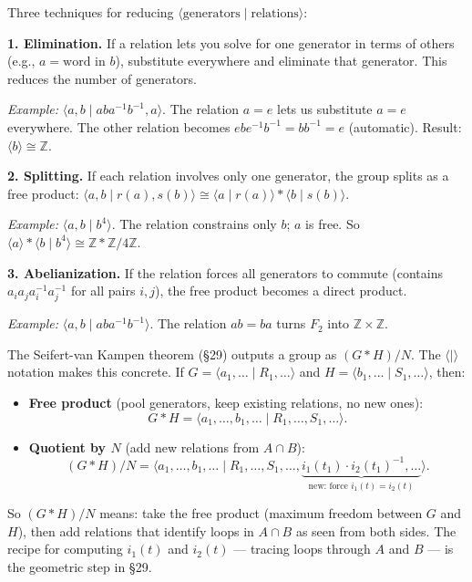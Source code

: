 \documentclass[11pt]{report}
\begin{document}
\begin{rembox}
Three techniques for reducing $\langle \text{generators} \mid \text{relations} \rangle$:

\textbf{1. Elimination.} If a relation lets you solve for one generator in terms of others (e.g., $a = \text{word in } b$), substitute everywhere and eliminate that generator. This reduces the number of generators.

\textit{Example:} $\langle a, b \mid aba^{-1}b^{-1}, a \rangle$. The relation $a = e$ lets us substitute $a = e$ everywhere. The other relation becomes $ebe^{-1}b^{-1} = bb^{-1} = e$ (automatic). Result: $\langle b \rangle \cong \mathbb{Z}$.

\textbf{2. Splitting.} If each relation involves only one generator, the group splits as a free product: $\langle a, b \mid r(a), s(b) \rangle \cong \langle a \mid r(a) \rangle * \langle b \mid s(b) \rangle$.

\textit{Example:} $\langle a, b \mid b^4 \rangle$. The relation constrains only $b$; $a$ is free. So $\langle a \rangle * \langle b \mid b^4 \rangle \cong \mathbb{Z} * \mathbb{Z}/4\mathbb{Z}$.

\textbf{3. Abelianization.} If the relation forces all generators to commute (contains $a_i a_j a_i^{-1} a_j^{-1}$ for all pairs $i, j$), the free product becomes a direct product.

\textit{Example:} $\langle a, b \mid aba^{-1}b^{-1} \rangle$. The relation $ab = ba$ turns $F_2$ into $\mathbb{Z} \times \mathbb{Z}$.
\end{rembox}

\begin{rembox}
The Seifert-van Kampen theorem (\S 29) outputs a group as $(G * H)/N$. The $\langle \mid \rangle$ notation makes this concrete. If $G = \langle a_1, \ldots \mid R_1, \ldots \rangle$ and $H = \langle b_1, \ldots \mid S_1, \ldots \rangle$, then:
\begin{itemize}[nosep]
    \item \textbf{Free product} (pool generators, keep existing relations, no new ones):
    \[G * H = \langle a_1, \ldots, b_1, \ldots \mid R_1, \ldots, S_1, \ldots \rangle.\]
    \item \textbf{Quotient by $N$} (add new relations from $A \cap B$):
    \[(G * H)/N = \langle a_1, \ldots, b_1, \ldots \mid R_1, \ldots, S_1, \ldots, \underbrace{i_1(t_1) \cdot i_2(t_1)^{-1}, \ldots}_{\text{new: force } i_1(t) = i_2(t)} \rangle.\]
\end{itemize}
So $(G * H)/N$ means: take the free product (maximum freedom between $G$ and $H$), then add relations that identify loops in $A \cap B$ as seen from both sides. The recipe for computing $i_1(t)$ and $i_2(t)$ --- tracing loops through $A$ and $B$ --- is the geometric step in \S 29.
\end{rembox}
\end{document}
